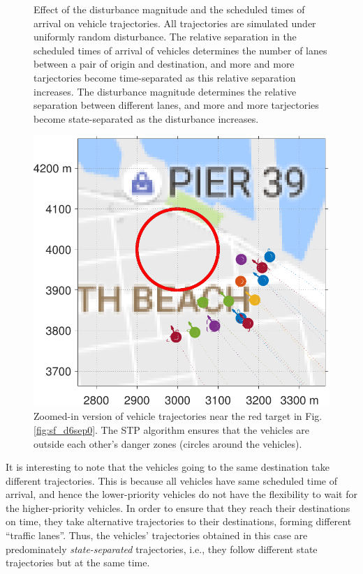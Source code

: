 \begin{figure}
\begin{subfigure}{0.5\textwidth}
    \label{fig:sf_d11sep5}
  \end{subfigure}
  \caption{Effect of the disturbance magnitude and the scheduled times of arrival on vehicle trajectories. All trajectories are simulated under uniformly random disturbance. The relative separation in the scheduled times of arrival of vehicles determines the number of lanes between a pair of origin and destination, and more and more tarjectories become time-separated as this relative separation increases. The disturbance magnitude determines the relative separation between different lanes, and more and more tarjectories become state-separated as the disturbance increases. }
  \label{fig:trajectories_sf}
\end{figure}

\begin{figure}[h]
  \centering
  \includegraphics[width=\columnwidth]{figs/sf_d6sep0_zoomed}
  \caption{Zoomed-in version of vehicle trajectories near the red target in Fig. \ref{fig:sf_d6sep0}. The STP algorithm ensures that the vehicles are outside each other's danger zones (circles around the vehicles).} 
  \label{fig:sf_d6sep0_zoomed}
\end{figure}
It is interesting to note that the vehicles going to the same destination take different trajectories. This is because all vehicles have same scheduled time of arrival, and hence the lower-priority vehicles do not have the flexibility to wait for the higher-priority vehicles. In order to ensure that they reach their destinations on time, they take alternative trajectories to their destinations, forming different ``traffic lanes''. Thus, the vehicles' trajectories obtained in this case are predominately \textit{state-separated} trajectories, i.e., they follow different state trajectories but at the same time. 

